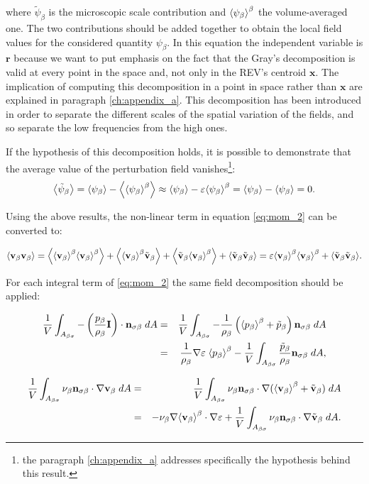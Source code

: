 \noindent where $\tilde{\psi}_{\beta}$ is the microscopic scale contribution and $ {\left< \psi_{\beta} \right>}^{\beta}$ the volume-averaged one. The two contributions should be added together to obtain the local field values for the considered quantity $\psi_{\beta}$.
In this equation the independent variable is $\mathbf{r}$ because we want to put emphasis on the fact that the Gray's decomposition is valid at every point in the space and, not only in the REV's centroid $\mathbf{x}$. The implication of computing this decomposition in a point in space rather than $\mathbf{x}$ are explained in paragraph \ref{ch:appendix_a}.
This decomposition has been introduced in order to separate the different scales of the spatial variation of the fields, and so separate the low frequencies from the high ones.

If the hypothesis of this decomposition holds, it is possible to demonstrate that the average value of the perturbation field vanishes\footnote{the paragraph \ref{ch:appendix_a} addresses specifically the hypothesis behind this result.}:
$$
{\left< \tilde{\psi}_{\beta} \right>} = {\left< \psi_{\beta} \right>} - {\left< {\left< \psi_{\beta} \right>}^{\beta} \right>} \approx {\left< \psi_{\beta} \right>} -\varepsilon {\left< \psi_{\beta} \right>}^{\beta} = {\left< \psi_{\beta} \right>} -{\left< \psi_{\beta} \right>} = 0.
$$


Using the above results, the non-linear term in equation \eqref{eq:mom_2} can be converted to:

\begin{equation}
{\left< \textbf{v}_{\beta}\textbf{v}_{\beta}\right>} = {\left< {\left< \textbf{v}_{\beta} \right>}^{\beta}{\left< \textbf{v}_{\beta} \right>}^{\beta} \right>} +{\left< {\left< \textbf{v}_{\beta} \right>}^{\beta}\tilde{\textbf{v}}_{\beta} \right>} +{\left< \tilde{\textbf{v}}_{\beta} {\left< \textbf{v}_{\beta} \right>}^{\beta} \right>} +{\left< \tilde{\textbf{v}}_{\beta} \tilde{\textbf{v}}_{\beta} \right>} = \varepsilon {\left< \textbf{v}_{\beta}\right>}^{\beta}{\left< \textbf{v}_{\beta} \right>}^{\beta} +{\left< \tilde{\textbf{v}}_{\beta}\tilde{\textbf{v}}_{\beta} \right>}.
\label{eq:dec_1}
\end{equation}

For each integral term of \eqref{eq:mom_2} the same field decomposition should be applied:

\begin{eqnarray}
\dfrac{1}{V} \int_{A_{\beta \sigma}}  - \left( \dfrac{p_{\beta}}{\rho_{\beta}} \mathbf{I} \right) \cdot \mathbf{n}_{\sigma \beta} \;dA &=& \dfrac{1}{V} \int_{A_{\beta \sigma}}  -\dfrac{1}{\rho_{\beta}} \left({\left< p_{\beta} \right>}^{\beta}   + \tilde{p}_{\beta} \right)  \mathbf{n}_{\sigma \beta} \;dA  \nonumber \\
&=& \dfrac{1}{\rho_{\beta}}\nabla\varepsilon \; {\left< p_{\beta} \right>}^{\beta} - \dfrac{1}{V} \int_{A_{\beta \sigma}}  \dfrac{\tilde{p}_{\beta}}{\rho_{\beta}}  \mathbf{n}_{\sigma \beta} \;dA,
\end{eqnarray}


\begin{eqnarray}
\dfrac{1}{V} \int_{A_{\beta \sigma}} \nu_{\beta} \mathbf{n}_{\sigma \beta} \cdot  \nabla \textbf{v}_{\beta}  \;dA &=& \dfrac{1}{V} \int_{A_{\beta \sigma}} \nu_{\beta} \mathbf{n}_{\sigma \beta} \cdot  \nabla ({\left< \textbf{v}_{\beta} \right>}^{\beta} +\tilde{\textbf{v}}_{\beta}) \;dA   \nonumber \\
&=& - \nu_{\beta}  \nabla {\left< \textbf{v}_{\beta}\right>}^{\beta} \cdot  \nabla \varepsilon + \dfrac{1}{V} \int_{A_{\beta \sigma}} \nu_{\beta}  \mathbf{n}_{\sigma \beta}  \cdot \nabla \tilde{\textbf{v}}_{\beta}  \;dA.
\end{eqnarray}

